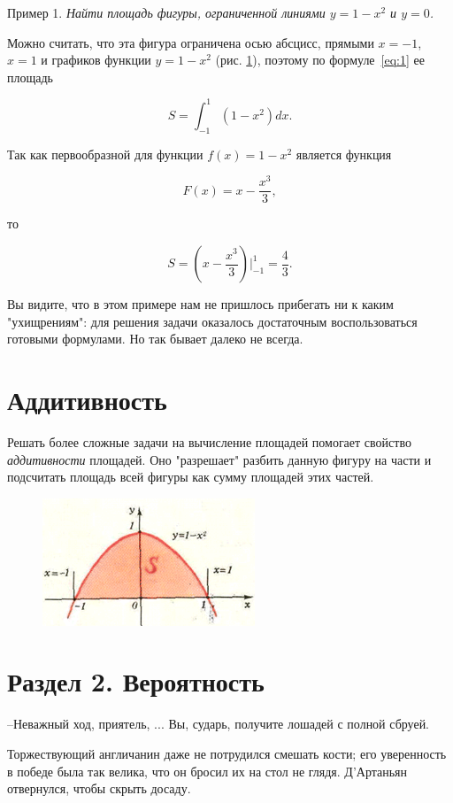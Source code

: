 \begin{multicols}{2}
Пример 1. \textit{Найти площадь фигуры, ограниченной линиями $y=1-x^2$ и $y=0$.}

Можно считать, что эта фигура ограничена осью абсцисс, прямыми $x=-1$, $x=1$ и графиков функции $y=1-x^2$ (рис. \ref{fig:img2}), поэтому по формуле~\eqref{eq:1} ее площадь 

\[S=\int_{-1}^1(1-x^2)dx.\]

\noindent Так как первообразной для функции $f(x)=1-x^2$ является функция 

\[F(x)=x-\frac{x^3}{3},\]

\noindent то

\[S=(x-\frac{x^3}{3})\Bigr\rvert_{-1}^1=\frac{4}{3}.\]

Вы видите, что в этом примере нам не пришлось прибегать ни к каким "ухищрениям": для решения задачи оказалось достаточным воспользоваться готовыми формулами. Но так бывает далеко не всегда.

\section{Аддитивность}
Решать более сложные задачи на вычисление площадей помогает свойство \textit{аддитивности} площадей. Оно "разрешает" разбить данную фигуру на части и подсчитать площадь всей фигуры как сумму площадей этих частей.

\begin{figure}[H]
    \centering
    \includegraphics{img2.png}
    \label{fig:img2}
    
\end{figure}

\section{Раздел 2. Вероятность}
--Неважный ход, приятель, ... Вы, сударь, получите лошадей с полной сбруей. 

Торжествующий англичанин даже не потрудился смешать кости; его уверенность в победе была так велика, что он бросил их на стол не глядя. Д'Артаньян отвернулся, чтобы скрыть досаду.


\end{multicols}
